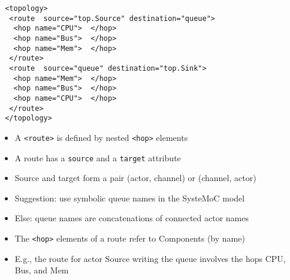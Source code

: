 \begin{frame}[fragile=singleslide]
\begin{lstlisting}
 <topology>
  <route  source="top.Source" destination="queue">
   <hop name="CPU">  </hop>
   <hop name="Bus">  </hop>
   <hop name="Mem">  </hop>
  </route>
  <route  source="queue" destination="top.Sink">
   <hop name="Mem">  </hop>
   <hop name="Bus">  </hop>
   <hop name="CPU">  </hop>
  </route>
 </topology>
\end{lstlisting}
\begin{itemize}
\item A \lstinline!<route>! is defined by nested \lstinline!<hop>! elements
\item A route has a \lstinline!source! and a \lstinline!target! attribute
\item Source and target form a pair (actor, channel) or (channel, actor)
\item Suggestion: use symbolic queue names in the SysteMoC model
\item Else: queue names are concatenations of connected actor names
\end{itemize}
\end{frame}

\begin{frame}[t]
\begin{figure}
\centering
\resizebox{0.7\columnwidth}{!}{}
\end{figure}

\begin{itemize}
\item The \lstinline!<hop>! elements of a route refer to Components (by name)
\item E.g., the route for actor Source writing the queue involves the hops CPU, Bus, and Mem
\end{itemize}

\end{frame}




